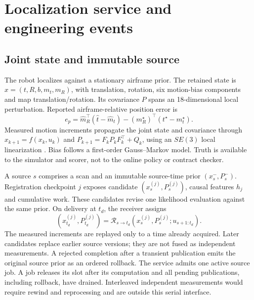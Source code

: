 \section{Localization service and engineering events}\label{sec:problem}
\subsection{Joint state and immutable source}
The robot localizes against a stationary airframe prior. The retained state is $x=(t,R,b,m_t,m_R)$, with translation, rotation, six motion-bias components and map translation/rotation. Its covariance $P$ spans an 18-dimensional local perturbation. Reported airframe-relative position error is
\begin{equation}
e_p=\widehat m_R^\top(\widehat t-\widehat m_t)-(m_R^\star)^\top(t^\star-m_t^\star).
\label{eq:relative-error}
\end{equation}
Measured motion increments propagate the joint state and covariance through $x_{k+1}=f(x_k,u_k)$ and $P_{k+1}=F_kP_kF_k^\top+Q_k$, using an $SE(3)$ local linearization \cite{barfoot2014}. Bias follows a first-order Gauss--Markov model. Truth is available to the simulator and scorer, not to the online policy or contract checker.

A source $s$ comprises a scan and an immutable source-time prior $(x_s^-,P_s^-)$. Registration checkpoint $j$ exposes candidate $(x_s^{(j)},P_s^{(j)})$, causal features $h_j$ and cumulative work. These candidates revise one likelihood evaluation against the same prior. On delivery at $t_d$, the receiver assigns
\begin{equation}
(x_{t_d}^{(j)},P_{t_d}^{(j)})=\mathcal R_{s\to t_d}(x_s^{(j)},P_s^{(j)};u_{s+1:t_d}).\label{eq:replay}
\end{equation}
The measured increments are replayed only to a time already acquired. Later candidates replace earlier source versions; they are not fused as independent measurements. A rejected completion after a transient publication emits the original source prior as an ordered rollback. The service admits one active source job. A job releases its slot after its computation and all pending publications, including rollback, have drained. Interleaved independent measurements would require rewind and reprocessing and are outside this serial interface.

